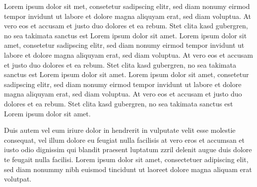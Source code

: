 \documentclass[a4paper, fleqn, headsepline, footsepline, 12pt, parskip=half]{scrartcl}
\begin{document}

\blankpage

\pagestyle{plain}




Lorem ipsum dolor sit met, consetetur sadipscing elitr, sed diam nonumy eirmod tempor invidunt ut labore et dolore magna aliquyam erat, sed diam voluptua. At vero eos et accusam et justo duo dolores et ea rebum. Stet clita kasd gubergren, no sea takimata sanctus est Lorem ipsum dolor sit amet. Lorem ipsum dolor sit amet, consetetur sadipscing elitr, sed diam nonumy eirmod tempor invidunt ut labore et dolore magna aliquyam erat, sed diam voluptua. At vero eos et accusam et justo duo dolores et ea rebum. Stet clita kasd gubergren, no sea takimata sanctus est Lorem ipsum dolor sit amet. Lorem ipsum dolor sit amet, consetetur sadipscing elitr, sed diam nonumy eirmod tempor invidunt ut labore et dolore magna aliquyam erat, sed diam voluptua. At vero eos et accusam et justo duo dolores et ea rebum. Stet clita kasd gubergren, no sea takimata sanctus est Lorem ipsum dolor sit amet.

Duis autem vel eum iriure dolor in hendrerit in vulputate velit esse molestie consequat, vel illum dolore eu feugiat nulla facilisis at vero eros et accumsan et iusto odio dignissim qui blandit praesent luptatum zzril delenit augue duis dolore te feugait nulla facilisi. Lorem ipsum dolor sit amet, consectetuer adipiscing elit, sed diam nonummy nibh euismod tincidunt ut laoreet dolore magna aliquam erat volutpat.
\end{document}
